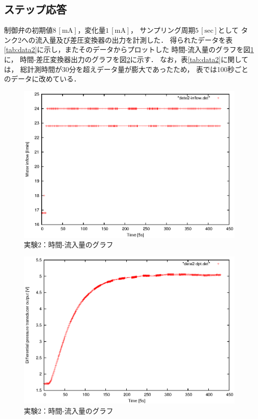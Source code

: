 \documentclass[11pt,a4paper]{jsarticle}
\begin{document}
\subsection{ステップ応答}

制御弁の初期値$8 \,\mathrm{[mA]}$，変化量$1 \,\mathrm{[mA]}$，
サンプリング周期$5 \,\mathrm{[sec]}$として
タンク2への流入量及び差圧変換器の出力を計測した．
得られたデータを表\ref{tab:data2}に示し，またそのデータからプロットした
時間-流入量のグラフを図\ref{fig:data2-inflow}に，
時間-差圧変換器出力のグラフを図\ref{fig:data2-dpt}に示す．
なお，表\ref{tab:data2}に関しては，
総計測時間が30分を超えデータ量が膨大であったため，
表では100秒ごとのデータに改めている．



\begin{figure}[b]
  \begin{center}
    \includegraphics[width=0.9\hsize]{./data/data2-inflow.eps}
  \end{center}
  \caption{実験2：時間-流入量のグラフ}
  \label{fig:data2-inflow}
\end{figure}

\begin{figure}[b]
  \begin{center}
    \includegraphics[width=0.9\hsize]{./data/data2-dpt.eps}
  \end{center}
  \caption{実験2：時間-流入量のグラフ}
  \label{fig:data2-dpt}
\end{figure}
\end{document}
